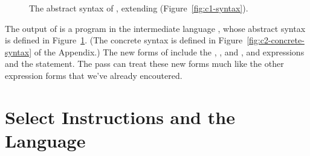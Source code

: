 \documentclass[11pt]{book}
\newcommand{\gray}[1]{{\color{gray} #1}}
\begin{document}
\begin{figure}[tp]
\fbox{
  \begin{minipage}{0.96\textwidth}
    \small
\[
\begin{array}{lcl}
\Atm &::=& \gray{ \INT{\Int} \mid \VAR{\Var} \mid \BOOL{\itm{bool}} }\\
\itm{cmp} &::= & \gray{  \key{eq?} \mid \key{<} } \\
\Exp &::= & \gray{ \Atm \mid \READ{} } \\
   &\mid& \gray{ \NEG{\Atm} \mid \ADD{\Atm}{\Atm} }\\
   &\mid& \gray{ \UNIOP{\key{not}}{\Atm} \mid \BINOP{\itm{cmp}}{\Atm}{\Atm}  } \\
   &\mid& \LP\key{Allocate} \,\itm{int}\,\itm{type}\RP \\
   &\mid& \BINOP{\key{'vector-ref}}{\Atm}{\INT{\Int}}  \\
   &\mid& \LP\key{Prim}~\key{'vector-set!}\,\LP\Atm\,\INT{\Int}\,\Atm\RP\RP\\
   &\mid& \LP\key{GlobalValue} \,\Var\RP \mid \LP\key{Void}\RP\\
\Stmt &::=& \gray{ \ASSIGN{\VAR{\Var}}{\Exp} } 
       \mid \LP\key{Collect} \,\itm{int}\RP \\
\Tail &::= & \gray{ \RETURN{\Exp} \mid \SEQ{\Stmt}{\Tail} 
       \mid \GOTO{\itm{label}} } \\
      &\mid& \gray{ \IFSTMT{\BINOP{\itm{cmp}}{\Atm}{\Atm}}{\GOTO{\itm{label}}}{\GOTO{\itm{label}}}  }\\
\LangCVec{} & ::= & \gray{ \CPROGRAM{\itm{info}}{\LP\LP\itm{label}\,\key{.}\,\Tail\RP\ldots\RP} }
\end{array}
\]
\end{minipage}
}
\caption{The abstract syntax of \LangCVec{}, extending \LangCIf{}
   (Figure~\ref{fig:c1-syntax}).}
\label{fig:c2-syntax}
\end{figure}

The output of  is a program in the
intermediate language \LangCVec{}, whose abstract syntax is defined in
Figure~\ref{fig:c2-syntax}.  (The concrete syntax is defined in
Figure~\ref{fig:c2-concrete-syntax} of the Appendix.)  The new forms
of \LangCVec{} include the , , and
, and  expressions and the
 statement.  The  pass can treat
these new forms much like the other expression forms that we've
already encoutered.


\section{Select Instructions and the \LangXGlobal{} Language}
\label{sec:select-instructions-gc}
\end{document}
